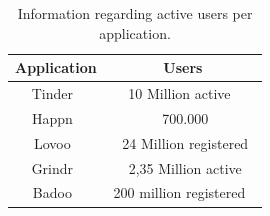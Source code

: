 \begin{table}[ht]
\centering
\caption{Information regarding active users per application.}
\def\arraystretch{2.0}
\begin{tabular}{| c | c |}
  \hline
    Application 				& Users  \\
  \hline
  \hline
    Tinder~\cite{tinder}		& 10 Million active~\cite{tinderusers} 	\\
    Happn~\cite{happn} 		& ~ 700.000~\cite{happnusers} 				\\
    Lovoo~\cite{lovoo} 		& ~ 24 Million registered~\cite{lovoousers}		\\
    Grindr~\cite{grindr} 		& ~ 2,35 Million active~\cite{grindrusers}\\
    Badoo~\cite{badoo}	 	& 200 million registered~\cite{badoousers}	\\
  \hline
\end{tabular}
\label{table:apps}
\end{table}

